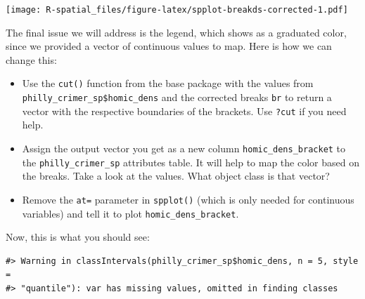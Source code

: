 \documentclass[]{book}
\newenvironment{Shaded}{\begin{snugshade}}{\end{snugshade}}
\newcommand{\KeywordTok}[1]{\textcolor[rgb]{0.13,0.29,0.53}{\textbf{#1}}}
\newcommand{\DataTypeTok}[1]{\textcolor[rgb]{0.13,0.29,0.53}{#1}}
\newcommand{\StringTok}[1]{\textcolor[rgb]{0.31,0.60,0.02}{#1}}
\newcommand{\OperatorTok}[1]{\textcolor[rgb]{0.81,0.36,0.00}{\textbf{#1}}}
\newcommand{\NormalTok}[1]{#1}
\providecommand{\tightlist}{%
  \setlength{\itemsep}{0pt}\setlength{\parskip}{0pt}}
\theoremstyle{definition}
\theoremstyle{definition}
\theoremstyle{definition}
\theoremstyle{remark}
\begin{document}
\texttt{[image: R-spatial\_files/figure-latex/spplot-breakds-corrected-1.pdf]}

The final issue we will address is the legend, which shows as a
graduated color, since we provided a vector of continuous values to map.
Here is how we can change this:

\begin{itemize}
\tightlist
\item
  Use the \texttt{cut()} function from the base package with the values
  from \texttt{philly\_crimer\_sp\$homic\_dens} and the corrected breaks
  \texttt{br} to return a vector with the respective boundaries of the
  brackets. Use \texttt{?cut} if you need help.\\
\item
  Assign the output vector you get as a new column
  \texttt{homic\_dens\_bracket} to the \texttt{philly\_crimer\_sp}
  attributes table. It will help to map the color based on the breaks.
  Take a look at the values. What object class is that vector?\\
\item
  Remove the \texttt{at=} parameter in \texttt{spplot()} (which is only
  needed for continuous variables) and tell it to plot
  \texttt{homic\_dens\_bracket}.
\end{itemize}

\begin{Shaded}
\end{Shaded}

Now, this is what you should see:

\begin{verbatim}
#> Warning in classIntervals(philly_crimer_sp$homic_dens, n = 5, style =
#> "quantile"): var has missing values, omitted in finding classes
\end{verbatim}
\end{document}
